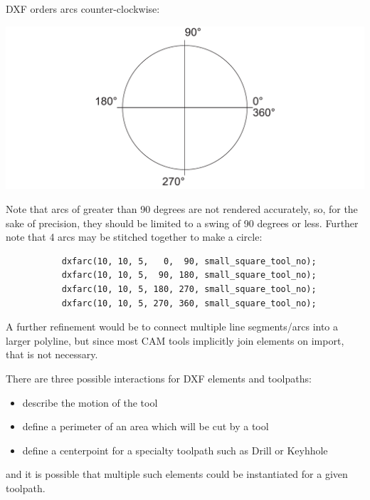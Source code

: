 \documentclass{ltxdoc}
\begin{document}
DXF orders arcs counter-clockwise:

\noindent\includegraphics[width=\linewidth]{images/arcs_circle_degrees.pdf}%

Note that arcs of greater than 90 degrees are not rendered accurately, so, for the sake of
precision, they should be limited to a swing of 90 degrees or less. Further note that 4 arcs
may be stitched together to make a circle:
 
\begin{verbatim}
           dxfarc(10, 10, 5,   0,  90, small_square_tool_no);
           dxfarc(10, 10, 5,  90, 180, small_square_tool_no);
           dxfarc(10, 10, 5, 180, 270, small_square_tool_no);
           dxfarc(10, 10, 5, 270, 360, small_square_tool_no);
\end{verbatim}
 
A further refinement would be to connect multiple line segments/arcs into a larger polyline, 
but since most CAM tools implicitly join elements on import, that is not necessary.
 
There are three possible interactions for DXF elements and toolpaths:

\begin{itemize}
 \item describe the motion of the tool
 \item define a perimeter of an area which will be cut by a tool
 \item define a centerpoint for a specialty toolpath such as Drill or Keyhhole
\end{itemize}
 
\noindent and it is possible that multiple such elements could be instantiated for
a given toolpath.
 
\end{document}
